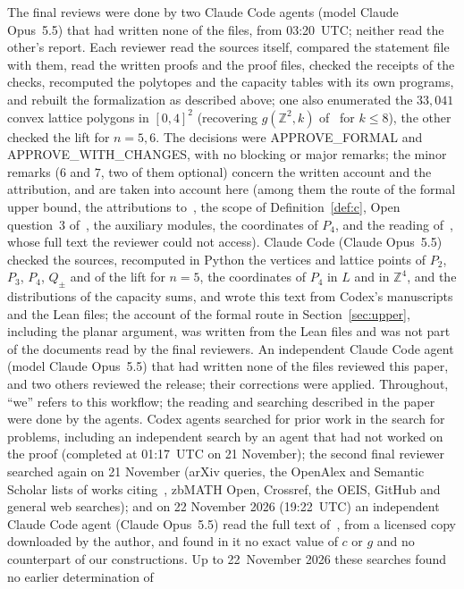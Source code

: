 \documentclass[11pt]{article}
\theoremstyle{definition}
\theoremstyle{remark}
\newcommand{\Z}{\mathbb Z}
\begin{document}
The final reviews were done by two Claude Code agents (model Claude Opus~5.5)
that had written none of the files, from 03:20~UTC; neither read the other's
report. Each reviewer read the sources itself, compared the statement file with
them, read the written proofs and the proof files, checked the receipts of the
checks, recomputed the polytopes and the capacity tables with its own
programs, and rebuilt the formalization as described above; one also
enumerated the $33{,}041$ convex lattice polygons in $[0,4]^2$ (recovering
$g(\Z^2,k)$ of~\cite{agm} for $k\le8$), the other checked the lift for $n=5,6$.
The decisions were APPROVE\_FORMAL and APPROVE\_WITH\_CHANGES, with no
blocking or major remarks; the minor remarks ($6$ and $7$, two of them
optional) concern the written account and the attribution, and are taken into
account here (among them the route of the formal upper bound, the attributions
to~\cite{agm,chz}, the scope of Definition~\ref{def:c}, Open question~3
of~\cite{agm}, the auxiliary modules, the coordinates of $P_4$, and the reading
of~\cite{hn}, whose full text the reviewer could not access). Claude Code (Claude Opus~5.5) checked the
sources, recomputed in Python the vertices and lattice points of $P_2$, $P_3$,
$P_4$, $Q_\pm$ and of the lift for $n=5$, the coordinates of $P_4$ in $L$ and in
$\Z^4$, and the distributions of the capacity sums, and wrote this text from
Codex's manuscripts and the Lean files; the account of the formal route in
Section~\ref{sec:upper}, including the planar argument, was written from the
Lean files and was not part of the documents read by the final reviewers. An independent Claude Code agent (model Claude Opus~5.5) that had written none of the files reviewed this paper, and two others reviewed the release; their corrections were applied. Throughout,
``we'' refers to this workflow; the reading and searching described in the
paper were done by the agents. Codex agents searched for prior work in the
search for problems, including an independent search by an agent that had not
worked on the proof (completed at 01:17~UTC on 21 November); the second final
reviewer searched again on 21 November (arXiv queries, the OpenAlex and
Semantic Scholar lists of works citing~\cite{abdl,agm,chz}, zbMATH Open,
Crossref, the OEIS, GitHub and general web searches); and on 22 November 2026 (19:22~UTC) an
independent Claude Code agent (Claude Opus~5.5) read the full text
of~\cite{hn}, from a licensed copy downloaded by the author, and found in it no exact value of $c$ or $g$ and no counterpart of our
constructions.
Up to 22~November 2026 these searches found no earlier determination of
\end{document}
